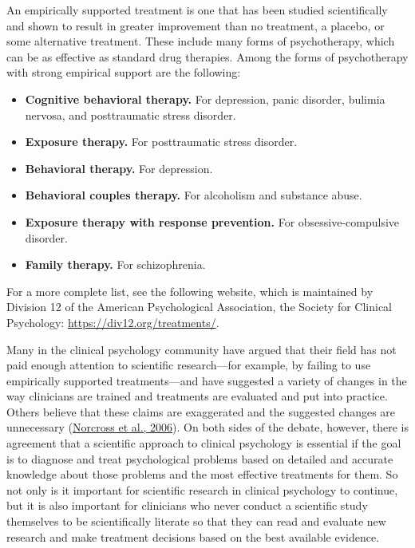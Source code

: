 \documentclass[
]{krantz}
\providecommand{\tightlist}{%
  \setlength{\itemsep}{0pt}\setlength{\parskip}{0pt}}
\begin{document}
An empirically supported treatment is one that has been studied scientifically and shown to result in greater improvement than no treatment, a placebo, or some alternative treatment. These include many forms of psychotherapy, which can be as effective as standard drug therapies. Among the forms of psychotherapy with strong empirical support are the following:

\begin{itemize}
\tightlist
\item
  \textbf{Cognitive behavioral therapy.} For depression, panic disorder, bulimia nervosa, and posttraumatic stress disorder.
\item
  \textbf{Exposure therapy.} For posttraumatic stress disorder.
\item
  \textbf{Behavioral therapy.} For depression.
\item
  \textbf{Behavioral couples therapy.} For alcoholism and substance abuse.
\item
  \textbf{Exposure therapy with response prevention.} For obsessive-compulsive disorder.
\item
  \textbf{Family therapy.} For schizophrenia.
\end{itemize}

For a more complete list, see the following website, which is maintained by Division 12 of the American Psychological Association, the Society for Clinical Psychology: \url{https://div12.org/treatments/}.

Many in the clinical psychology community have argued that their field has not paid enough attention to scientific research---for example, by failing to use empirically supported treatments---and have suggested a variety of changes in the way clinicians are trained and treatments are evaluated and put into practice. Others believe that these claims are exaggerated and the suggested changes are unnecessary (\protect\hyperlink{ref-norcross2006evidence}{Norcross et al., 2006}). On both sides of the debate, however, there is agreement that a scientific approach to clinical psychology is essential if the goal is to diagnose and treat psychological problems based on detailed and accurate knowledge about those problems and the most effective treatments for them. So not only is it important for scientific research in clinical psychology to continue, but it is also important for clinicians who never conduct a scientific study themselves to be scientifically literate so that they can read and evaluate new research and make treatment decisions based on the best available evidence.
\end{document}
